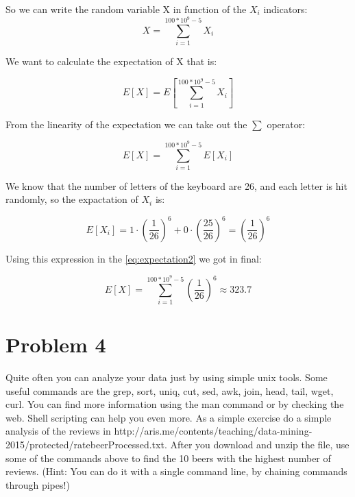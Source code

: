 \documentclass{article}
\begin{document}
So we can write the random variable X in function of the $X_{i}$ indicators:
\begin{equation} \label{eq:bernoulli2}
X = \sum_{i=1}^{100*10^9 -5} X_{i}
\end{equation}

We want to calculate the expectation of X that is:

\begin{equation} \label{eq:expectation1}
E[X] = E \left[ \sum_{i=1}^{100*10^9 -5} X_{i} \right]
\end{equation}

From the linearity of the expectation we can take out the $\sum$ operator:

\begin{equation} \label{eq:expectation2}
E[X] = \sum_{i=1}^{100*10^9 -5}E \left[  X_{i} \right]
\end{equation}

We know that the number of letters of the keyboard are 26, and each letter is hit randomly, so the expactation of $X_{i}$ is:

\begin{equation} \label{eq:expectation3}
E[X_{i}] = 1 \cdot \left( \frac  {1}{26} \right)^{6} + 0 \cdot \left( \frac{25}{26} \right)^{6} = \left( \frac  {1}{26} \right)^{6}
\end{equation}

Using this expression in the \eqref{eq:expectation2} we got in final:

\begin{equation} \label{eq:expectation4}
E[X] = \sum_{i=1}^{100*10^9 -5} \left( \frac  {1}{26} \right)^{6} 	\approx 323.7
\end{equation}





\section{Problem 4}
Quite often you can analyze your data just by using simple unix tools. Some useful commands are the grep, sort, uniq, cut, sed, awk, join, head, tail, wget, curl. You can find more information using the man command or by checking the web. Shell scripting can help you even more.
As a simple exercise do a simple analysis of the reviews in http://aris.me/contents/teaching/data-mining-2015/protected/ratebeerProcessed.txt. After you download and unzip the file, use some of the commands above to find the 10 beers with the highest number of reviews. (Hint: You can do it with a single command line, by chaining commands through pipes!)
\end{document}
